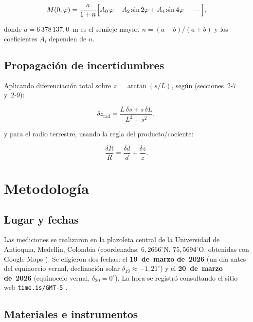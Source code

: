 \begin{equation}
  M(0,\varphi) = \frac{a}{1+n}
  \Bigl[A_0\,\varphi - A_2\sin 2\varphi
        + A_4\sin 4\varphi - \cdots\Bigr],
  \label{eq:helmert}
\end{equation}

donde $a = 6\,378\,137{,}0$~m es el semieje mayor, $n = (a-b)/(a+b)$
y los coeficientes $A_i$ dependen de $n$.

\subsection{Propagación de incertidumbres}

Aplicando diferenciación total sobre $z = \arctan(s/L)$,
según \citet{Baird1991} (secciones~2-7 y~2-9):

\begin{equation}
  \delta z_\text{rad}
  = \frac{L\,\delta s + s\,\delta L}{L^2 + s^2},
  \label{eq:delta_z}
\end{equation}

y para el radio terrestre, usando la regla del producto/cociente:

\begin{equation}
  \frac{\delta R}{R} = \frac{\delta d}{d} + \frac{\delta z}{z}.
  \label{eq:delta_R}
\end{equation}

\section{Metodología}

\subsection{Lugar y fechas}

Las mediciones se realizaron en la plazoleta central de la
Universidad de Antioquia, Medellín, Colombia
(coordenadas: $6{,}2666^\circ\text{N}$, $75{,}5694^\circ\text{O}$,
obtenidas con Google Maps \citep{GoogleMaps2026}).
Se eligieron dos fechas: el \textbf{19~de~marzo de~2026} (un día antes
del equinoccio vernal, declinación solar $\delta_{19} \approx -1{,}21^\circ$)
y el \textbf{20~de~marzo de~2026} (equinoccio vernal,
$\delta_{20} = 0^\circ$).
La hora se registró consultando el sitio web \texttt{time.is/GMT-5}
\citep{TimeIs2026}.

\subsection{Materiales e instrumentos}

